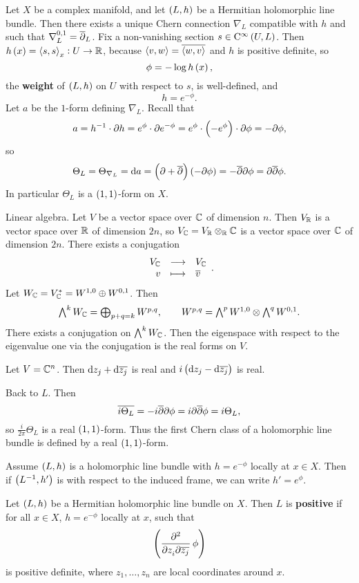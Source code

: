 Let $ X $ be a complex manifold, and let $ \br{L, h} $ be a Hermitian holomorphic line bundle. Then there exists a unique Chern connection $ \nabla_L $ compatible with $ h $ and such that $ \nabla_L^{0, 1} = \overline{\partial}_L $. Fix a non-vanishing section $ s \in \Ci{U, L} $. Then $ h\br{x} = \abr{s, s}_x : U \to \RR $, because $ \left\langle v, w \right\rangle = \overline{\left\langle w, v \right\rangle} $ and $ h $ is positive definite, so
$$ \phi = -\log h\br{x}, $$
the \textbf{weight} of $ \br{L, h} $ on $ U $ with respect to $ s $, is well-defined, and
$$ h = e^{-\phi}. $$
Let $ a $ be the $ 1 $-form defining $ \nabla_L $. Recall that
$$ a = h^{-1} \cdot \da h = e^\phi \cdot \da e^{-\phi} = e^\phi \cdot \br{-e^{\phi}} \cdot \da\phi = -\da\phi, $$
so
$$ \Theta_L = \Theta_{\nabla_L} = \d a = \br{\da + \dab}\br{-\da\phi} = -\dab\da\phi = \da\dab\phi. $$
In particular $ \Theta_L $ is a $ \br{1, 1} $-form on $ X $.

\begin{remark*}
Linear algebra. Let $ V $ be a vector space over $ \mathbb{C} $ of dimension $ n $. Then $ V_{\mathbb{R}} $ is a vector space over $ \mathbb{R} $ of dimension $ 2n $, so $ V_{\mathbb{C}} = V_{\mathbb{R}} \otimes_{\mathbb{R}} \mathbb{C} $ is a vector space over $ \mathbb{C} $ of dimension $ 2n $. There exists a conjugation
$$ \function{V_\CC}{V_\CC}{v}{\overline{v}}. $$
Let $ W_{\mathbb{C}} = V_{\mathbb{C}}^* = W^{1, 0} \oplus W^{0, 1} $. Then
$$ \textstyle\bigwedge^kW_{\mathbb{C}} = \bigoplus_{p + q = k} W^{p, q}, \qquad W^{p, q} = \textstyle\bigwedge^pW^{1, 0} \otimes \textstyle\bigwedge^qW^{0, 1}. $$
There exists a conjugation on $ \textstyle\bigwedge^kW_{\mathbb{C}} $. Then the eigenspace with respect to the eigenvalue one via the conjugation is the real forms on $ V $.
\end{remark*}

\begin{example*}
Let $ V = \mathbb{C}^n $. Then $ \mathrm{d} z_j + \mathrm{d}\overline{z_j} $ is real and $ i\br{\d z_j - \d\overline{z_j}} $ is real.
\end{example*}

Back to $ L $. Then
$$ \overline{i\Theta_L} = -i\overline{\partial}\partial\phi = i\partial\overline{\partial}\phi = i\Theta_L, $$
so $ \tfrac{i}{2\pi}\Theta_L $ is a real $ \br{1, 1} $-form. Thus the first Chern class of a holomorphic line bundle is defined by a real $ \br{1, 1} $-form.

\begin{remark}
Assume $ \br{L, h} $ is a holomorphic line bundle with $ h = e^{-\phi} $ locally at $ x \in X $. Then if $ \br{L^{-1}, h'} $ is with respect to the induced frame, we can write $ h' = e^\phi $.
\end{remark}

\begin{definition}
Let $ \br{L, h} $ be a Hermitian holomorphic line bundle on $ X $. Then $ L $ is \textbf{positive} if for all $ x \in X $, $ h = e^{-\phi} $ locally at $ x $, such that
$$ \br{\dmd{}{2}{z_i}{}{\overline{z_j}}{}\phi} $$
is positive definite, where $ z_1, \dots, z_n $ are local coordinates around $ x $.
\end{definition}

